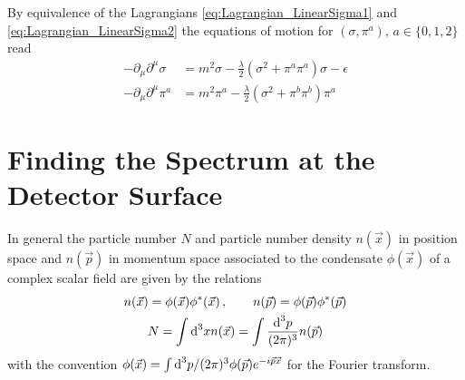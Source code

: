 By equivalence of the Lagrangians \eqref{eq:Lagrangian_LinearSigma1} and \eqref{eq:Lagrangian_LinearSigma2} the equations of motion for $(\sigma,\pi^a)$, $a\in\{0,1,2\}$ read
\begin{subequations}
    \begin{align}
        -\partial_\mu\partial^\mu\sigma & =m^2\sigma-\frac{\lambda}{2}(\sigma^2+\pi^a\pi^a)\sigma-\epsilon \\
        -\partial_\mu\partial^\mu\pi^a  & =m^2\pi^a-\frac{\lambda}{2}(\sigma^2+\pi^b\pi^b)\pi^a
    \end{align}
\end{subequations}


\section{Finding the Spectrum at the Detector Surface}

In general the particle number $N$ and particle number density $n(\vec{x})$ in position space and $n(\vec{p})$ in momentum space associated to the condensate $\phi(\vec{x})$ of a complex scalar field are given by the relations
\begin{subequations}
    \begin{gather}
        n(\vec{x})=\phi(\vec{x})\phi^*(\vec{x})\,,\qquad n(\vec{p})=\phi(\vec{p})\phi^*(\vec{p})\\
        N=\int\text{d}^3xn(\vec{x})=\int\frac{\text{d}^3p}{(2\pi)^3}n(\vec{p})
    \end{gather}
\end{subequations}
with the convention $\phi(\vec{x})=\int\text{d}^3p/(2\pi)^3\phi(\vec{p})e^{-{i}\vec{p}\vec{x}}$ for the Fourier transform.



